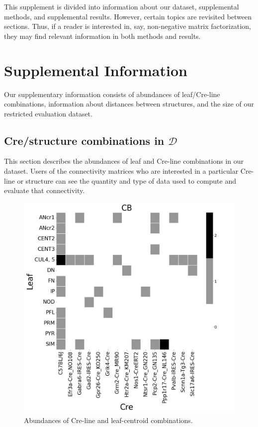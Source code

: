 This supplement is divided into information about our dataset, supplemental methods, and supplemental results.
However, certain topics are revisited between sections.
Thus, if a reader is interested in, say, non-negative matrix factorization, they may find relevant information in both methods and results.

\section{Supplemental Information}
\label{supp_sec:info}

Our supplementary information consists of abundances of leaf/Cre-line combinations, information about distances between structures, and the size of our restricted evaluation dataset.

\subsection{Cre/structure combinations in $\mathcal D$}
\label{supp_sec:data}

This section describes the abundances of leaf and Cre-line combinations in our dataset.
Users of the connectivity matrices who are interested in a particular Cre-line or structure can see the quantity and type of data used to compute and evaluate that connectivity.

\newpage

\begin{figure}[H]
    \centering
    \includegraphics[width = 7in]{figs/CB centroid density.png}
        \caption{Abundances of Cre-line and leaf-centroid combinations.}
            \label{fig:my_label}
\end{figure}
\newpage

